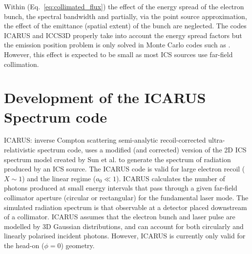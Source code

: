 \documentclass[../main.tex]{subfiles}
\begin{document}
Within (Eq.~\ref{eq:collimated_flux}) the effect of the energy spread of the electron bunch, the spectral bandwidth and partially, via the point source approximation, the effect of the emittance (spatial extent) of the bunch are neglected. The codes \textsc{ICARUS} and \textsc{ICCS3D} \cite{krafft2016laser,ranjan2018simulation} properly take into account the energy spread factors but the emission position problem is only solved in Monte Carlo codes such as  \cite{chen1995cain}. However, this effect is expected to be small as most ICS sources use far-field collimation.

\section{Development of the ICARUS Spectrum code}
\label{sec:development_of_the_ICARUS_spectrum_code}

\textsc{ICARUS}: inverse Compton scattering semi-analytic recoil-corrected ultra-relativistic spectrum code, uses a modified (and corrected) version of the 2D ICS spectrum model created by Sun et al. \cite{sun2009characterizations,sun2011theoretical} to generate the spectrum of radiation produced by an ICS source. The \textsc{ICARUS} code is valid for large electron recoil ($X\sim1$) and the linear regime ($a_{0}\ll 1$). \textsc{ICARUS} calculates the number of photons produced at small energy intervals that pass through a given far-field collimator aperture (circular or rectangular) for the fundamental laser mode. The simulated radiation spectrum is that observable at a detector placed downstream of a collimator. \textsc{ICARUS} assumes that the electron bunch and laser pulse are modelled by 3D Gaussian distributions, and can account for both circularly and linearly polarised incident photons. However, \textsc{ICARUS} is currently only valid for the head-on ($\phi = 0$) geometry.
\end{document}
